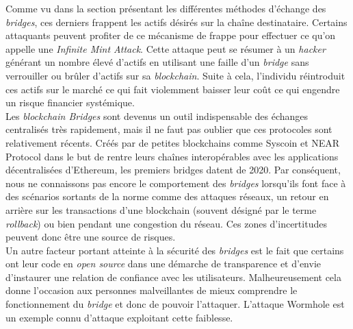 Comme vu dans la section présentant les différentes méthodes d’échange des \textit{bridges}, ces derniers frappent les \gls{actif}s désirés sur la chaîne destinataire. Certains attaquants peuvent profiter de ce mécanisme de frappe pour effectuer ce qu’on appelle une \textit{Infinite Mint Attack}.\cite{ChainLinkRisks} Cette attaque peut se résumer à un \textit{hacker} générant un nombre élevé d’\gls{actif}s en utilisant une faille d’un \textit{bridge} sans verrouiller ou brûler d’\gls{actif}s sur sa \textit{\gls{blockchain}}. Suite à cela, l’individu réintroduit ces \gls{actif}s sur le marché ce qui fait violemment baisser leur coût ce qui engendre un risque financier systémique.\\

Les \textit{\gls{blockchain} Bridges} sont devenus un outil indispensable des échanges centralisés très rapidement, mais il ne faut pas oublier que ces protocoles sont relativement récents. Créés par de petites \gls{blockchain}s comme Syscoin et NEAR Protocol dans le but de rentre leurs chaînes interopérables avec les applications décentralisées d’Ethereum, les premiers bridges datent de 2020\cite{Bitstamp}. Par conséquent, nous ne connaissons pas encore le comportement des \textit{bridges} lorsqu’ils font face à des scénarios sortants de la norme comme des attaques réseaux, un retour en arrière sur les transactions d’une \gls{blockchain} (souvent désigné par le terme \textit{rollback}) ou bien pendant une congestion du réseau. Ces zones d’incertitudes peuvent donc être une source de risques. \\

Un autre facteur portant atteinte à la sécurité des \textit{bridges} est le fait que certains ont leur code en \textit{open source} dans une démarche de transparence et d’envie d’instaurer une relation de confiance avec les utilisateurs. Malheureusement cela donne l’occasion aux personnes malveillantes de mieux comprendre le fonctionnement du \textit{bridge} et donc de pouvoir l’attaquer. L’attaque Wormhole est un exemple connu d’attaque exploitant cette faiblesse.

